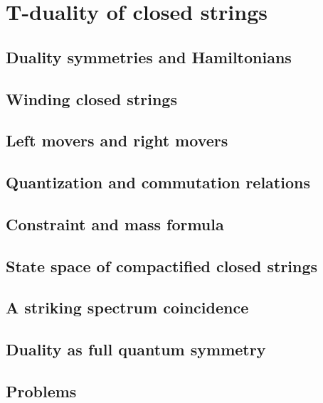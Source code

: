 \documentclass[12pt]{report}
\begin{document}
\chapter{T-duality of closed strings}
\newpage
\section{Duality symmetries and Hamiltonians}
\section{Winding closed strings}
\section{Left movers and right movers}
\section{Quantization and commutation relations}
\section{Constraint and mass formula}
\section{State space of compactified closed strings}
\section{A striking spectrum coincidence}
\section{Duality as full quantum symmetry}
\section{Problems}
\end{document}
